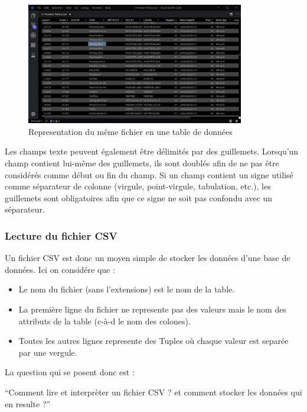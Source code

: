 \documentclass[oneside,13pt,a4paper]{report}
\begin{document}
\begin{figure}[!h]
	\centering
	\includegraphics[width=0.85\textwidth]{img/csv_tables.png}
	\caption{Representation du même fichier en une table de données}
\end{figure}

Les champs texte peuvent également être délimités par des guillemets. Lorsqu'un champ contient lui-même des guillemets, ils sont doublés afin de ne pas être considérés comme début ou fin du champ.
Si un champ contient un signe utilisé comme séparateur de colonne (virgule, point-virgule, tabulation, etc.), les guillemets sont obligatoires afin que ce signe ne soit pas confondu avec un séparateur.

\subsubsection{Lecture du fichier CSV}

Un fichier CSV est donc un moyen simple de stocker les données d'une base de données.
Ici on considére que :
\begin{itemize}
	\item Le nom du fichier (sans l'extensions) est le nom de la table.
	\item La première ligne du fichier ne represente pas des valeurs mais le nom des attributs de la table (c-à-d le nom des colones).
	\item Toutes les autres lignes represente des Tuples où chaque valeur est separée par une vergule.
\end{itemize}
\vspace{0.3cm}

La question qui se posent donc est :
\begin{center}
	\enquote{Comment lire et interprèter un fichier CSV ? et comment stocker les données qui en resulte ?}
\end{center}
\end{document}
